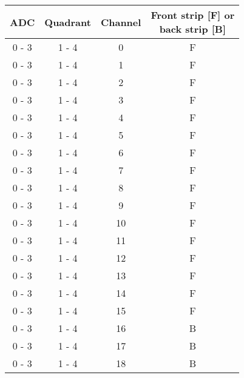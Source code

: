 \begin{tabular}{cccc}
\hline
ADC    & Quadrant & Channel &  \shortstack{Front strip [F] or \\ back strip [B]} \\
\hline
0 - 3  &  1 - 4   &  0      &  F                                                 \\
0 - 3  &  1 - 4   &  1      &  F                                                 \\
0 - 3  &  1 - 4   &  2      &  F                                                 \\
0 - 3  &  1 - 4   &  3      &  F                                                 \\
0 - 3  &  1 - 4   &  4      &  F                                                 \\
0 - 3  &  1 - 4   &  5      &  F                                                 \\
0 - 3  &  1 - 4   &  6      &  F                                                 \\
0 - 3  &  1 - 4   &  7      &  F                                                 \\
0 - 3  &  1 - 4   &  8      &  F                                                 \\
0 - 3  &  1 - 4   &  9      &  F                                                 \\
0 - 3  &  1 - 4   &  10     &  F                                                 \\
0 - 3  &  1 - 4   &  11     &  F                                                 \\
0 - 3  &  1 - 4   &  12     &  F                                                 \\
0 - 3  &  1 - 4   &  13     &  F                                                 \\
0 - 3  &  1 - 4   &  14     &  F                                                 \\
0 - 3  &  1 - 4   &  15     &  F                                                 \\
0 - 3  &  1 - 4   &  16     &  B                                                 \\
0 - 3  &  1 - 4   &  17     &  B                                                 \\
0 - 3  &  1 - 4   &  18     &  B                                                 \\

\end{tabular}
